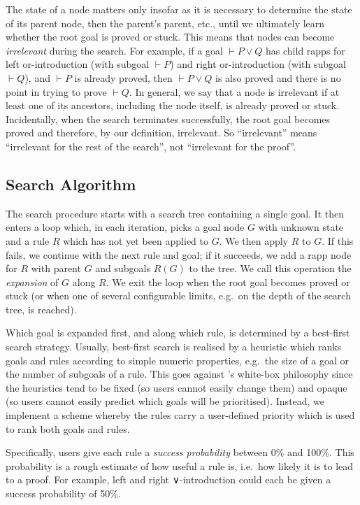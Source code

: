 The state of a node matters only insofar as it is necessary to determine the state of its parent node, then the parent's parent, etc., until we ultimately learn whether the root goal is proved or stuck.
This means that nodes can become \emph{irrelevant} during the search.
For example, if a goal $⊢ P ∨ Q$ has child rapps for left or-introduction (with subgoal $⊢ P$) and right or-introduction (with subgoal $⊢ Q$), and $⊢ P$ is already proved, then $⊢ P ∨ Q$ is also proved and there is no point in trying to prove $⊢ Q$.
In general, we say that a node is irrelevant if at least one of its ancestors, including the node itself, is already proved or stuck.
Incidentally, when the search terminates successfully, the root goal becomes proved and therefore, by our definition, irrelevant. So \enquote{irrelevant} means \enquote{irrelevant for the rest of the search}, not \enquote{irrelevant for the proof}.


\subsection{Search Algorithm}%
\label{sec:search}

The search procedure starts with a search tree containing a single goal.
It then enters a loop which, in each iteration, picks a goal node $G$ with unknown state and a rule $R$ which has not yet been applied to $G$.
We then apply $R$ to $G$.
If this fails, we continue with the next rule and goal; if it succeeds, we add a rapp node for $R$ with parent $G$ and subgoals $R(G)$ to the tree.
We call this operation the \emph{expansion} of $G$ along $R$.
We exit the loop when the root goal becomes proved or stuck (or when one of several configurable limits, e.g.\ on the depth of the search tree, is reached).

Which goal is expanded first, and along which rule, is determined by a best-first search strategy.
Usually, best-first search is realised by a heuristic which ranks goals and rules according to simple numeric properties, e.g.\ the size of a goal or the number of subgoals of a rule.
This goes against \Aesop's white-box philosophy since the heuristics tend to be fixed (so users cannot easily change them) and opaque (so users cannot easily predict which goals will be prioritised).
Instead, we implement a scheme whereby the rules carry a user-defined priority which is used to rank both goals and rules.

Specifically, \Aesop{} users give each rule a \emph{success probability} between 0\% and 100\%.
This probability is a rough estimate of how useful a rule is, i.e.\ how likely it is to lead to a proof.
For example, left and right ∨-introduction could each be given a success probability of 50\%.

